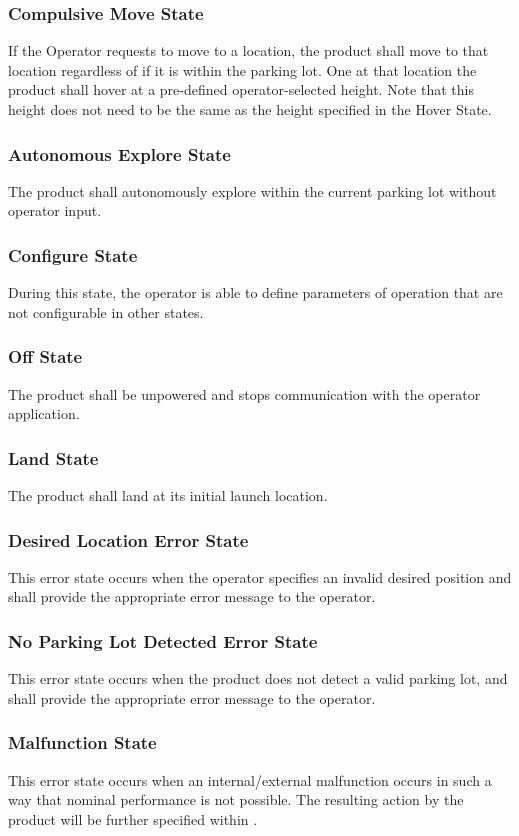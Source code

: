 \documentclass{article}
\begin{document}
\subsubsection{Compulsive Move State}
\label{Compulsive Move State}
If the Operator requests to move to a location, the product shall move to that location regardless of if it is within the parking lot. One at that location the product shall hover at a pre-defined operator-selected height. Note that this height does not need to be the same as the height specified in the Hover State. 
\subsubsection{Autonomous Explore State}
\label{Autonomous Explore State}
The product shall autonomously explore within the current parking lot without operator input. 
\subsubsection{Configure State}
\label{Configure State}
During this state, the operator is able to define parameters of operation that are not configurable in other states. 
\subsubsection{Off State}
\label{Off State}
The product shall be unpowered and stops communication with the operator application. 
\subsubsection{Land State}
\label{Land State}
The product shall land at its initial launch location.
\subsubsection{Desired Location Error State}
\label{Desired Location Error State}
This error state occurs when the operator specifies an invalid desired position and shall provide the appropriate error message to the operator. 
\subsubsection{No Parking Lot Detected Error State}
\label{No Parking Lot Detected Error State}
This error state occurs when the product does not detect a valid parking lot, and shall provide the appropriate error message to the operator.
\subsubsection{Malfunction State}
\label{Malfunction State}
This error state occurs when an internal/external malfunction occurs in such a way that nominal performance is not possible. The resulting action by the product will be further specified within . 
\end{document}
